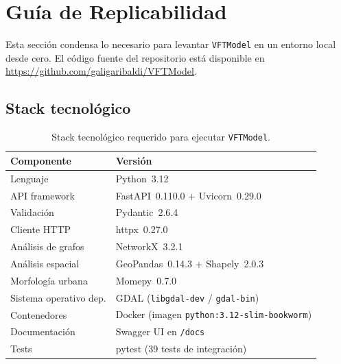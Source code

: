 
\section{Guía de Replicabilidad}
\label{anx:vft-replicabilidad}

Esta sección condensa lo necesario para levantar \texttt{VFTModel} en un entorno local
desde cero. El código fuente del repositorio está disponible en
\url{https://github.com/galigaribaldi/VFTModel}.

\subsection*{Stack tecnológico}

\begin{table}[H]
    \centering
    \small
    \caption[Stack tecnológico de \texttt{VFTModel}]{Stack tecnológico requerido para
    ejecutar \texttt{VFTModel}.
    }
    \label{tab:vft-stack}
    \begin{tabular}{|l|l|}
        \hline
        \textbf{Componente}   & \textbf{Versión} \\ \hline
        Lenguaje              & Python~3.12 \\ \hline
        API framework         & FastAPI~0.110.0 + Uvicorn~0.29.0 \\ \hline
        Validación            & Pydantic~2.6.4 \\ \hline
        Cliente HTTP          & httpx~0.27.0 \\ \hline
        Análisis de grafos    & NetworkX~3.2.1 \\ \hline
        Análisis espacial     & GeoPandas~0.14.3 + Shapely~2.0.3 \\ \hline
        Morfología urbana     & Momepy~0.7.0 \\ \hline
        Sistema operativo dep.& GDAL (\texttt{libgdal-dev} / \texttt{gdal-bin}) \\ \hline
        Contenedores          & Docker (imagen \texttt{python:3.12-slim-bookworm}) \\ \hline
        Documentación \api{}  & Swagger UI en \texttt{/docs} \\ \hline
        Tests                 & pytest (39 tests de integración) \\ \hline
    \end{tabular}
\end{table}

